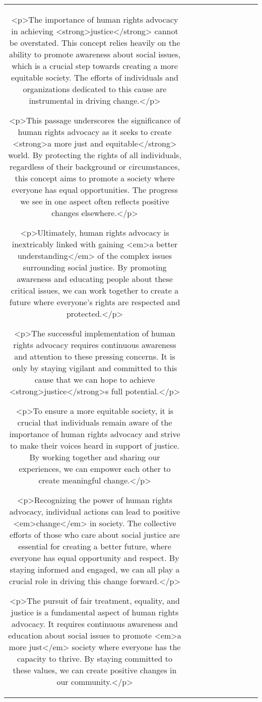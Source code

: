 \begin{table}[h!]
\begin{tabular}{|c|c|c|c|c|c|c|c|c|c|}
<p>The importance of human rights advocacy in achieving <strong>justice</strong> cannot be overstated. This concept relies heavily on the ability to promote awareness about social issues, which is a crucial step towards creating a more equitable society. The efforts of individuals and organizations dedicated to this cause are instrumental in driving change.</p>

<p>This passage underscores the significance of human rights advocacy as it seeks to create <strong>a more just and equitable</strong> world. By protecting the rights of all individuals, regardless of their background or circumstances, this concept aims to promote a society where everyone has equal opportunities. The progress we see in one aspect often reflects positive changes elsewhere.</p>

<p>Ultimately, human rights advocacy is inextricably linked with gaining <em>a better understanding</em> of the complex issues surrounding social justice. By promoting awareness and educating people about these critical issues, we can work together to create a future where everyone's rights are respected and protected.</p>

<p>The successful implementation of human rights advocacy requires continuous awareness and attention to these pressing concerns. It is only by staying vigilant and committed to this cause that we can hope to achieve <strong>justice</strong>s full potential.</p>

<p>To ensure a more equitable society, it is crucial that individuals remain aware of the importance of human rights advocacy and strive to make their voices heard in support of justice. By working together and sharing our experiences, we can empower each other to create meaningful change.</p>

<p>Recognizing the power of human rights advocacy, individual actions can lead to positive <em>change</em> in society. The collective efforts of those who care about social justice are essential for creating a better future, where everyone has equal opportunity and respect. By staying informed and engaged, we can all play a crucial role in driving this change forward.</p>

<p>The pursuit of fair treatment, equality, and justice is a fundamental aspect of human rights advocacy. It requires continuous awareness and education about social issues to promote <em>a more just</em> society where everyone has the capacity to thrive. By staying committed to these values, we can create positive changes in our community.</p>


\end{tabular}
\end{table}
